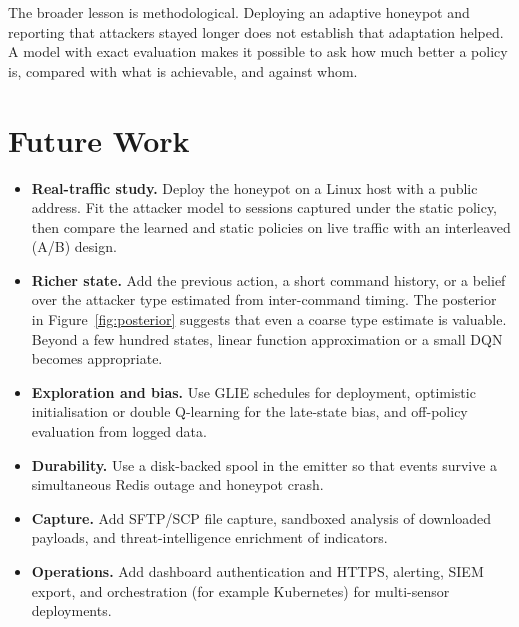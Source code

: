 The broader lesson is methodological. Deploying an adaptive honeypot and reporting that
attackers stayed longer does not establish that adaptation helped. A model with exact evaluation
makes it possible to ask how much better a policy is, compared with what is achievable, and
against whom.

\section{Future Work}

\begin{itemize}
  \item \textbf{Real-traffic study.} Deploy the honeypot on a Linux host with a public address.
    Fit the attacker model to sessions captured under the static policy, then compare the learned
    and static policies on live traffic with an interleaved (A/B) design.
  \item \textbf{Richer state.} Add the previous action, a short command history, or a belief over
    the attacker type estimated from inter-command timing. The posterior in
    Figure~\ref{fig:posterior} suggests that even a coarse type estimate is valuable. Beyond a few
    hundred states, linear function approximation or a small DQN becomes appropriate.
  \item \textbf{Exploration and bias.} Use GLIE schedules for deployment, optimistic
    initialisation or double Q-learning for the late-state bias, and off-policy evaluation from
    logged data.
  \item \textbf{Durability.} Use a disk-backed spool in the emitter so that events survive a
    simultaneous Redis outage and honeypot crash.
  \item \textbf{Capture.} Add SFTP/SCP file capture, sandboxed analysis of downloaded payloads, and
    threat-intelligence enrichment of indicators.
  \item \textbf{Operations.} Add dashboard authentication and HTTPS, alerting, SIEM export, and
    orchestration (for example Kubernetes) for multi-sensor deployments.
\end{itemize}

